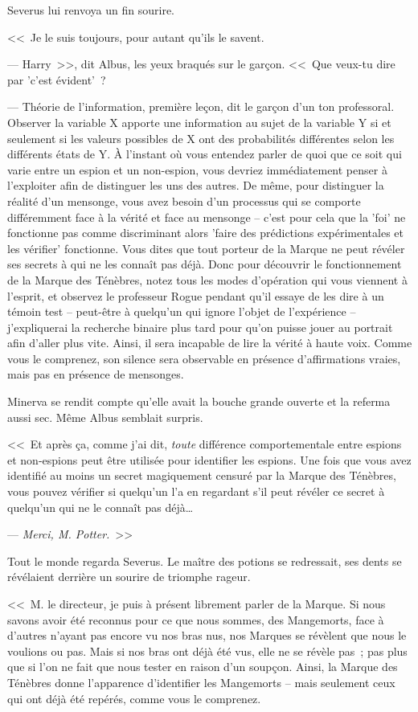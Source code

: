 Severus lui renvoya un fin sourire.

<<~Je le suis toujours, pour autant qu'ils le savent.

--- Harry~>>, dit Albus, les yeux braqués sur le garçon. <<~Que veux-tu dire par 'c'est évident'~?

--- Théorie de l'information, première leçon, dit le garçon d'un ton professoral. Observer la variable X apporte une information au sujet de la variable Y si et seulement si les valeurs possibles de X ont des probabilités différentes selon les différents états de Y. À l'instant où vous entendez parler de quoi que ce soit qui varie entre un espion et un non-espion, vous devriez immédiatement penser à l'exploiter afin de distinguer les uns des autres. De même, pour distinguer la réalité d'un mensonge, vous avez besoin d'un processus qui se comporte différemment face à la vérité et face au mensonge -- c'est pour cela que la 'foi' ne fonctionne pas comme discriminant alors 'faire des prédictions expérimentales et les vérifier' fonctionne. Vous dites que tout porteur de la Marque ne peut révéler ses secrets à qui ne les connaît pas déjà. Donc pour découvrir le fonctionnement de la Marque des Ténèbres, notez tous les modes d'opération qui vous viennent à l'esprit, et observez le professeur Rogue pendant qu'il essaye de les dire à un témoin test -- peut-être à quelqu'un qui ignore l'objet de l'expérience -- j'expliquerai la recherche binaire plus tard pour qu'on puisse jouer au portrait afin d'aller plus vite. Ainsi, il sera incapable de lire la vérité à haute voix. Comme vous le comprenez, son silence sera observable en présence d'affirmations vraies, mais pas en présence de mensonges.

Minerva se rendit compte qu'elle avait la bouche grande ouverte et la referma aussi sec. Même Albus semblait surpris.

<<~Et après ça, comme j'ai dit, \emph{toute} différence comportementale entre espions et non-espions peut être utilisée pour identifier les espions. Une fois que vous avez identifié au moins un secret magiquement censuré par la Marque des Ténèbres, vous pouvez vérifier si quelqu'un l'a en regardant s'il peut révéler ce secret à quelqu'un qui ne le connaît pas déjà…

--- \emph{Merci, M. Potter.}~>>

Tout le monde regarda Severus. Le maître des potions se redressait, ses dents se révélaient derrière un sourire de triomphe rageur.

<<~M. le directeur, je puis à présent librement parler de la Marque. Si nous savons avoir été reconnus pour ce que nous sommes, des Mangemorts, face à d'autres n'ayant pas encore vu nos bras nus, nos Marques se révèlent que nous le voulions ou pas. Mais si nos bras ont déjà été vus, elle ne se révèle pas~; pas plus que si l'on ne fait que nous tester en raison d'un soupçon. Ainsi, la Marque des Ténèbres donne l'apparence d'identifier les Mangemorts -- mais seulement ceux qui ont déjà été repérés, comme vous le comprenez.

